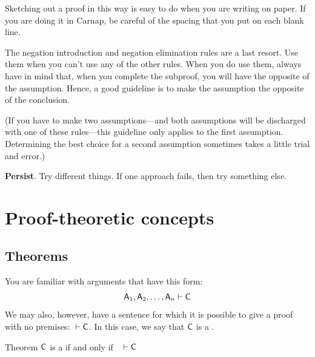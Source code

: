 \begin{earg}
Sketching out a proof in this way is easy to do when you are writing on paper. If you are doing it in Carnap, be careful of the spacing that you put on each blank line.

\medskip

\item[\ex{18-7}] The negation introduction and negation elimination rules are a last resort. Use them when you can't use any of the other rules. When you do use them, always have in mind that, when you complete the subproof, you will have the opposite of the assumption. Hence, a good guideline is to make the assumption the opposite of the conclusion. 

(If you have to make two assumptions---and both assumptions will be discharged with one of these rules---this guideline only applies to the first assumption. Determining the best choice for a second assumption sometimes takes a little trial and error.)  
\medskip

\item[\ex{18-8}] \textbf{Persist}. Try different things. If one approach fails, then try something else.
\end{earg}




\chapter{Proof-theoretic concepts}\label{s:ProofTheoreticConcepts}

\section{Theorems}\label{s:theorems}

You are familiar with arguments that have this form:
$$\mathsf{A}_1, \mathsf{A}_2, \ldots, \mathsf{A}_n \vdash \mathsf{C}$$
We may also, however, have a sentence for which it is possible to give a proof with no premises: ${} \vdash \mathsf{C}$. In this case, we say that $\mathsf{C}$ is a .

\begin{factboxy}{Theorem}\label{def:syntactic_tautology_in_sl}
$\mathsf{C}$ is a  if and only if ~ $\vdash \mathsf{C}$
\end{factboxy}

